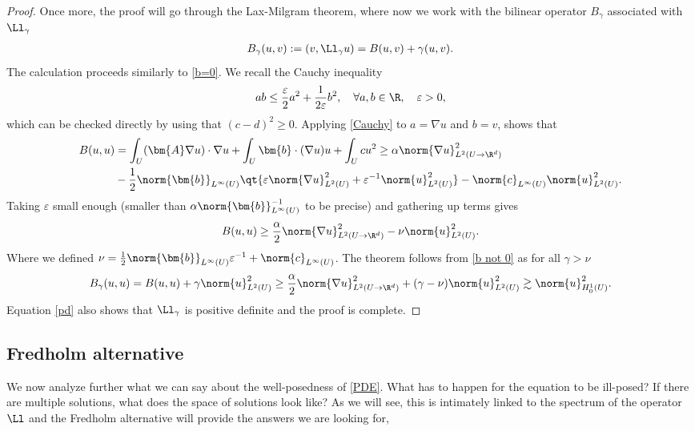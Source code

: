 \documentclass[
    a4paper,
    DIV=14,
    abstract=true,
    numbers=noenddot
]{scrartcl}
\begin{document}
\begin{proof}
    Once more, the proof will go through the Lax-Milgram theorem, where now we work with the bilinear operator $B_\gamma $ associated with $\Ll_\gamma $
    \begin{align*}
        B_\gamma (u,v):= (v, \Ll_\gamma u)=B(u,v) + \gamma (u,v).
    \end{align*}
    The calculation proceeds similarly to \eqref{b=0}. We recall the Cauchy inequality
    \begin{align}\label{Cauchy}
        ab\leq\frac{\varepsilon }{2} a^2+ \frac{1}{2 \varepsilon } b^2 , \quad\forall a,b \in \R, \quad \varepsilon >0,
    \end{align}
    which can be checked directly by using that $(c-d)^2 \geq 0$. Applying \eqref{Cauchy}
    to $a=\nabla u$ and $b= v$, shows that
    \begin{align*}
        B(u,u) & = \int_{U}(\bm{A} \nabla u) \cdot \nabla u + \int_{U} \bm{b}\cdot (\nabla u) u + \int_{U} cu^2 \geq \alpha \norm{\nabla u}^2_{L^2(U \to \R^d)}                          \\
               & - \frac{1}{2}\norm{\bm{b}}_{L^\infty(U)} \qt{\varepsilon \norm{\nabla u}_{L^2(U)}^2+ \varepsilon ^{-1}\norm{u}^2_{L^2(U)}}- \norm{c}_{L^\infty(U)}\norm{u}^2_{L^2(U)} .
    \end{align*}
    Taking $\varepsilon $ small enough (smaller than $ \alpha \norm{\bm{b}}_{L^\infty(U)}^{-1}$ to be precise) and gathering up terms gives
    \begin{align}\label{b not 0}
        B(u,u) \geq \frac{\alpha}{2} \norm{\nabla u}^2_{L^2(U \to \R^d)} -\nu \norm{u}^2_{L^2(U)}.
    \end{align}
    Where we defined $\nu = \frac{1}{2}\norm{\bm{b}}_{L^\infty(U)} \varepsilon ^{-1}+\norm{c}_{L^\infty(U)}$. The theorem follows from  \eqref{b not 0} as for all $\gamma > \nu$
    \begin{align}\label{pd}
        B_\gamma (u,u)=B(u,u)+ \gamma \norm{u}^2_{L^2(U)} \geq\frac{\alpha}{2} \norm{\nabla u}^2_{L^2(U \to \R^d)}+(\gamma - \nu) \norm{u}^2_{L^2(U)}\gtrsim \norm{u}^2_{H_0^1(U)} .
    \end{align}
    Equation \eqref{pd} also shows that $\Ll_\gamma$ is positive definite and the proof is complete.
\end{proof}
\subsection{Fredholm alternative}\label{fred sec}
We now analyze further what we can say about the well-posedness of \eqref{PDE}. What has to happen for the equation to be ill-posed? If there are multiple solutions, what does the space of solutions look like? As we will see, this is intimately linked to the spectrum of the operator $\Ll$ and the Fredholm alternative will provide the answers we are looking for,
\end{document}
